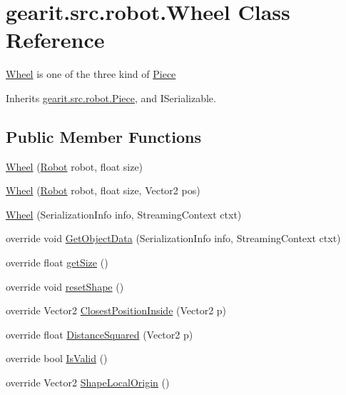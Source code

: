 \hypertarget{classgearit_1_1src_1_1robot_1_1_wheel}{\section{gearit.\+src.\+robot.\+Wheel Class Reference}
\label{classgearit_1_1src_1_1robot_1_1_wheel}
}


\hyperlink{classgearit_1_1src_1_1robot_1_1_wheel}{Wheel} is one of the three kind of \hyperlink{classgearit_1_1src_1_1robot_1_1_piece}{Piece}  




Inherits \hyperlink{classgearit_1_1src_1_1robot_1_1_piece}{gearit.\+src.\+robot.\+Piece}, and I\+Serializable.

\subsection*{Public Member Functions}
\begin{DoxyCompactItemize}
\item 
\hyperlink{classgearit_1_1src_1_1robot_1_1_wheel_ac37202de84091296a16ef6338331b99e}{Wheel} (\hyperlink{classgearit_1_1src_1_1robot_1_1_robot}{Robot} robot, float size)
\item 
\hyperlink{classgearit_1_1src_1_1robot_1_1_wheel_a137a89fbe00f37c6507767cce4d2c8bc}{Wheel} (\hyperlink{classgearit_1_1src_1_1robot_1_1_robot}{Robot} robot, float size, Vector2 pos)
\item 
\hyperlink{classgearit_1_1src_1_1robot_1_1_wheel_a84b5c3c068f5c47f09f9958eb0d18e01}{Wheel} (Serialization\+Info info, Streaming\+Context ctxt)
\item 
override void \hyperlink{classgearit_1_1src_1_1robot_1_1_wheel_ad80d4ab25ce754ea965fd281500a3f85}{Get\+Object\+Data} (Serialization\+Info info, Streaming\+Context ctxt)
\item 
override float \hyperlink{classgearit_1_1src_1_1robot_1_1_wheel_a53187a3061ac473ea26bde10b17c5609}{get\+Size} ()
\item 
override void \hyperlink{classgearit_1_1src_1_1robot_1_1_wheel_ae75e8069a811803d95c10ea05aaad609}{reset\+Shape} ()
\item 
override Vector2 \hyperlink{classgearit_1_1src_1_1robot_1_1_wheel_af846d9609aa1c7a178fc3b5f622df206}{Closest\+Position\+Inside} (Vector2 p)
\item 
override float \hyperlink{classgearit_1_1src_1_1robot_1_1_wheel_aab527883ae40529f44ad9d7207f249a4}{Distance\+Squared} (Vector2 p)
\item 
override bool \hyperlink{classgearit_1_1src_1_1robot_1_1_wheel_a1cd59fa76d80d4a66ee587950d823a39}{Is\+Valid} ()
\item 
override Vector2 \hyperlink{classgearit_1_1src_1_1robot_1_1_wheel_a967c20594697bf89f33a381d2698443b}{Shape\+Local\+Origin} ()
\end{DoxyCompactItemize}

